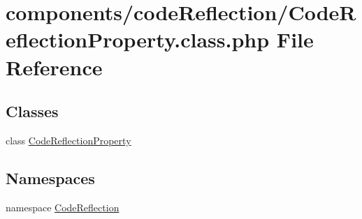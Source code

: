 \hypertarget{_code_reflection_property_8class_8php}{
\section{components/codeReflection/CodeReflectionProperty.class.php File Reference}
\label{_code_reflection_property_8class_8php}
}
\subsection*{Classes}
\begin{CompactItemize}
\item 
class \hyperlink{class_code_reflection_property}{CodeReflectionProperty}
\end{CompactItemize}
\subsection*{Namespaces}
\begin{CompactItemize}
\item 
namespace \hyperlink{namespace_code_reflection}{CodeReflection}
\end{CompactItemize}
